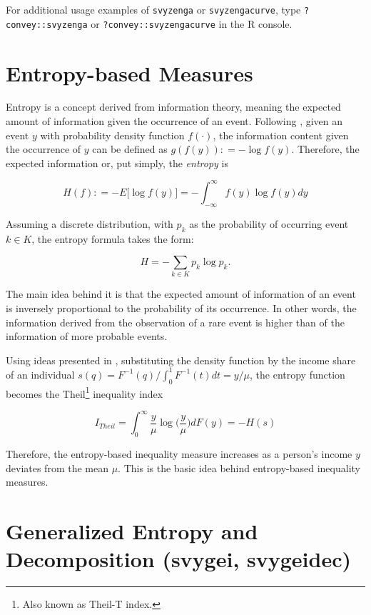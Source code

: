 \documentclass[]{book}
\begin{document}
For additional usage examples of \texttt{svyzenga} or \texttt{svyzengacurve}, type \texttt{?convey::svyzenga} or \texttt{?convey::svyzengacurve} in the R console.

\hypertarget{entropy-based-measures}{%
\section{Entropy-based Measures}\label{entropy-based-measures}}

Entropy is a concept derived from information theory, meaning the expected amount of information given the occurrence of an event. Following \citep{shannon1948}, given an event \(y\) with probability density function \(f(\cdot)\), the information content given the occurrence of \(y\) can be defined as \(g(f(y)) \colon= - \log f(y)\). Therefore, the expected information or, put simply, the \emph{entropy} is

\[
H(f) \colon = -E \big[ \log f(y) \big] = - \int_{-\infty}^{\infty} f(y) \log f(y) dy
\]

Assuming a discrete distribution, with \(p_k\) as the probability of occurring event \(k \in K\), the entropy formula takes the form:

\[
H = - \sum_{k \in K} p_k \log p_k \text{.}
\]

The main idea behind it is that the expected amount of information of an event is inversely proportional to the probability of its occurrence. In other words, the information derived from the observation of a rare event is higher than of the information of more probable events.

Using ideas presented in \citet{cowell2009}, substituting the density function by the income share of an individual \(s(q) = {F}^{-1}(q) / \int_{0}^{1} F^{-1}(t)dt = y/\mu\), the entropy function becomes the Theil\footnote{Also known as Theil-T index.} inequality index

\[
I_{Theil} = \int_{0}^{\infty} \frac{y}{\mu} \log \bigg( \frac{y}{\mu} \bigg) dF(y) = -H(s)
\]

Therefore, the entropy-based inequality measure increases as a person's income \(y\) deviates from the mean \(\mu\). This is the basic idea behind entropy-based inequality measures.

\hypertarget{generalized-entropy-and-decomposition-svygei-svygeidec}{%
\section{Generalized Entropy and Decomposition (svygei, svygeidec)}\label{generalized-entropy-and-decomposition-svygei-svygeidec}}
\end{document}
